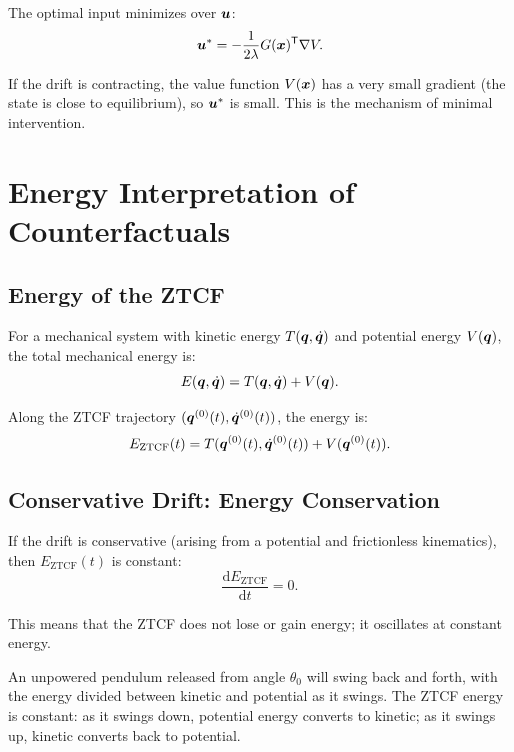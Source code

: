 The optimal input minimizes over $\bm{u}$:
\begin{equation}
\bm{u}^* = -\frac{1}{2\lambda}G(\bm{x})^{\mathsf{T}} \nabla V.
\label{eq:ch7:optimal-input}
\end{equation}

If the drift is contracting, the value function $V(\bm{x})$ has a very small gradient (the
state is close to equilibrium), so $\bm{u}^*$ is small. This is the mechanism of minimal
intervention.

\section{Energy Interpretation of Counterfactuals}

\subsection{Energy of the ZTCF}

For a mechanical system with kinetic energy $T(\bm{q},\dot{\bm{q}})$ and potential energy $V(\bm{q})$,
the total mechanical energy is:
\begin{equation}
E(\bm{q},\dot{\bm{q}}) = T(\bm{q},\dot{\bm{q}}) + V(\bm{q}).
\label{eq:ch7:total-energy}
\end{equation}

Along the ZTCF trajectory $(\bm{q}^{(0)}(t), \dot{\bm{q}}^{(0)}(t))$, the energy is:
\begin{equation}
E_{\text{ZTCF}}(t) = T(\bm{q}^{(0)}(t), \dot{\bm{q}}^{(0)}(t)) + V(\bm{q}^{(0)}(t)).
\label{eq:ch7:ztcf-energy}
\end{equation}

\subsection{Conservative Drift: Energy Conservation}

If the drift is conservative (arising from a potential and frictionless kinematics), then
$E_{\text{ZTCF}}(t)$ is constant:
\begin{equation}
\frac{\mathrm{d}E_{\text{ZTCF}}}{\mathrm{d}t} = 0.
\label{eq:ch7:energy-conservation}
\end{equation}

This means that the ZTCF does not lose or gain energy; it oscillates at constant energy.

\begin{example}
An unpowered pendulum released from angle $\theta_0$ will swing back and forth, with the
energy divided between kinetic and potential as it swings. The ZTCF energy is constant: as
it swings down, potential energy converts to kinetic; as it swings up, kinetic converts
back to potential.
\end{example}

